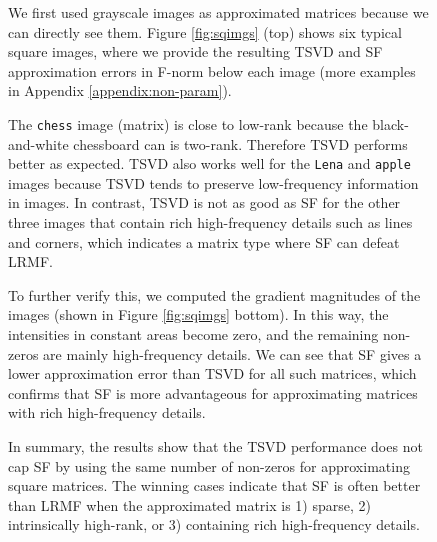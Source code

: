 \documentclass{article}
\begin{document}
\begin{figure}[t]
\begin{center}
We first used  grayscale images as approximated matrices because we can directly see them. Figure \ref{fig:sqimgs} (top) shows six typical square images, where we provide the resulting TSVD and SF approximation errors in F-norm below each image (more examples in Appendix \ref{appendix:non-param}).

The \texttt{chess} image (matrix) is close to low-rank because the black-and-white chessboard can is two-rank. Therefore TSVD performs better as expected. TSVD also works well for the \texttt{Lena} and \texttt{apple} images because TSVD tends to preserve low-frequency information in images. In contrast, TSVD is not as good as SF for the other three images that contain rich high-frequency details such as lines and corners, which indicates a matrix type where SF can defeat LRMF.

To further verify this, we computed the gradient magnitudes of the images (shown in Figure \ref{fig:sqimgs} bottom). In this way, the intensities in constant areas become zero, and the remaining non-zeros are mainly high-frequency details. We can see that SF gives a lower approximation error than TSVD for all such matrices, which confirms that SF is more advantageous for approximating matrices with rich high-frequency details.

In summary, the results show that the TSVD performance does not cap SF by using the same number of non-zeros for approximating square matrices. The winning cases indicate that SF is often better than LRMF when the approximated matrix is 1) sparse, 2) intrinsically high-rank, or 3) containing rich high-frequency details.


\end{center}
\end{figure}
\end{document}
